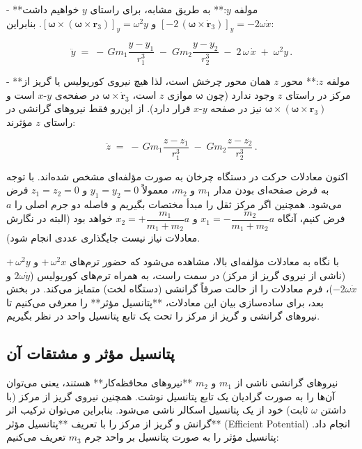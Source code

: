 - **مولفه \(y\):** به طریق مشابه، برای راستای \(y\) خواهیم داشت \([-2\,(\boldsymbol{\omega}\times\dot{\mathbf{r}}_3)]_y = -2\omega\dot{x}\) و \([\boldsymbol{\omega} \times (\boldsymbol{\omega}\times\mathbf{r}_3)]_y = \omega^2 y\). بنابراین: 

\[
\ddot{y} \;=\; -\,G m_1 \dfrac{y - y_1}{r_1^3}\;-\;G m_2 \dfrac{y - y_2}{r_2^3}\;-\;2\,\omega\,\dot{x}\;+\;\omega^2 y\,.
\] 

- **مولفه \(z\):** محور \(z\) همان محور چرخش است، لذا هیچ نیروی کوریولیس یا گریز از مرکز در راستای \(z\) وجود ندارد (چون \(\boldsymbol{\omega}\) موازی \(z\) است، \( \boldsymbol{\omega}\times\dot{\mathbf{r}}_3 \) در صفحه‌ی \(x\text{-}y\) است و \(\boldsymbol{\omega}\times(\boldsymbol{\omega}\times\mathbf{r}_3)\) نیز در صفحه \(x\text{-}y\) قرار دارد). از این‌رو فقط نیروهای گرانشی در راستای \(z\) مؤثرند: 

\[
\ddot{z} \;=\; -\,G m_1 \dfrac{z - z_1}{r_1^3}\;-\;G m_2 \dfrac{z - z_2}{r_2^3}\,. 
\] 

اکنون معادلات حرکت در دستگاه چرخان به صورت مؤلفه‌ای مشخص شده‌اند. با توجه به فرض صفحه‌ای بودن مدار \(m_1\) و \(m_2\)، معمولاً \(y_1 = y_2 = 0\) و \(z_1 = z_2 = 0\) فرض می‌شود. همچنین اگر مرکز ثقل را مبدأ مختصات بگیریم و فاصله دو جرم اصلی را \(a\) فرض کنیم، آنگاه \(x_1 = -\dfrac{m_2}{m_1+m_2}a\) و \(x_2 = +\dfrac{m_1}{m_1+m_2}a\) خواهد بود (البته در نگارش معادلات نیاز نیست جایگذاری عددی انجام شود). 

با نگاه به معادلات مؤلفه‌ای بالا، مشاهده می‌شود که حضور ترم‌های \(+\,\omega^2 x\) و \(+\,\omega^2 y\) (ناشی از نیروی گریز از مرکز) در سمت راست، به همراه ترم‌های کوریولیس (\(2\omega \dot{y}\) و \(-2\omega \dot{x}\))، فرم معادلات را از حالت صرفاً گرانشی (دستگاه لخت) متمایز می‌کند. در بخش بعد، برای ساده‌سازی بیان این معادلات، **پتانسیل مؤثر** را معرفی می‌کنیم تا نیروهای گرانشی و گریز از مرکز را تحت یک تابع پتانسیل واحد در نظر بگیریم.

\subsection{پتانسیل مؤثر و مشتقات آن}

نیروهای گرانشی ناشی از \(m_1\) و \(m_2\) **نیروهای محافظه‌کار** هستند، یعنی می‌توان آن‌ها را به صورت گرادیان یک تابع پتانسیل نوشت. همچنین نیروی گریز از مرکز (با داشتن \(\omega\) ثابت) خود از یک پتانسیل اسکالر ناشی می‌شود. بنابراین می‌توان ترکیب اثر گرانش و گریز از مرکز را با تعریف **پتانسیل مؤثر** (Efficient Potential) انجام داد. پتانسیل مؤثر را به صورت پتانسیل بر واحد جرم \(m_3\) تعریف می‌کنیم:


